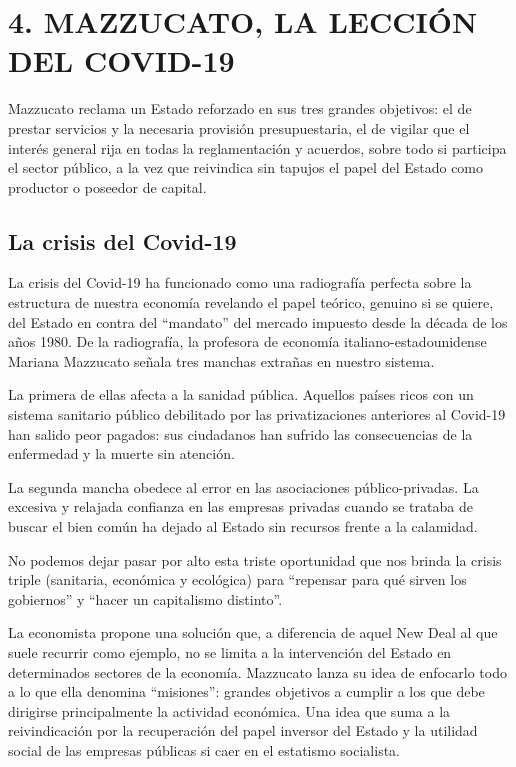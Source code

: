 \documentclass[
]{article}
\begin{document}
\hypertarget{mazzucato-la-lecciuxf3n-del-covid-19}{%
\section{4. MAZZUCATO, LA LECCIÓN DEL
COVID-19}\label{mazzucato-la-lecciuxf3n-del-covid-19}}

Mazzucato reclama un Estado reforzado en sus tres grandes objetivos: el
de prestar servicios y la necesaria provisión presupuestaria, el de
vigilar que el interés general rija en todas la reglamentación y
acuerdos, sobre todo si participa el sector público, a la vez que
reivindica sin tapujos el papel del Estado como productor o poseedor de
capital.

\hypertarget{la-crisis-del-covid-19}{%
\subsection{La crisis del Covid-19}\label{la-crisis-del-covid-19}}

La crisis del Covid-19 ha funcionado como una radiografía perfecta sobre
la estructura de nuestra economía revelando el papel teórico, genuino si
se quiere, del Estado en contra del ``mandato'' del mercado impuesto
desde la década de los años 1980. De la radiografía, la profesora de
economía italiano-estadounidense Mariana Mazzucato señala tres manchas
extrañas en nuestro sistema.

La primera de ellas afecta a la sanidad pública. Aquellos países ricos
con un sistema sanitario público debilitado por las privatizaciones
anteriores al Covid-19 han salido peor pagados: sus ciudadanos han
sufrido las consecuencias de la enfermedad y la muerte sin atención.

La segunda mancha obedece al error en las asociaciones público-privadas.
La excesiva y relajada confianza en las empresas privadas cuando se
trataba de buscar el bien común ha dejado al Estado sin recursos frente
a la calamidad.

No podemos dejar pasar por alto esta triste oportunidad que nos brinda
la crisis triple (sanitaria, económica y ecológica) para ``repensar para
qué sirven los gobiernos'' y ``hacer un capitalismo distinto''.

La economista propone una solución que, a diferencia de aquel New Deal
al que suele recurrir como ejemplo, no se limita a la intervención del
Estado en determinados sectores de la economía. Mazzucato lanza su idea
de enfocarlo todo a lo que ella denomina ``misiones'': grandes objetivos
a cumplir a los que debe dirigirse principalmente la actividad
económica. Una idea que suma a la reivindicación por la recuperación del
papel inversor del Estado y la utilidad social de las empresas públicas
si caer en el estatismo socialista.
\end{document}
